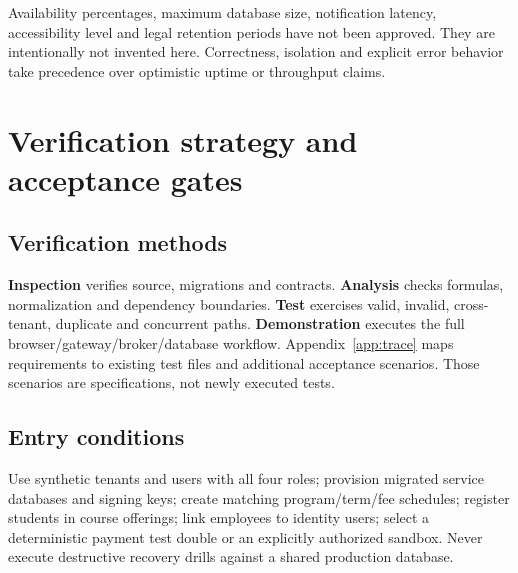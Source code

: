 \documentclass[10pt,a4paper]{article}
\begin{document}
Availability percentages, maximum database size, notification latency, accessibility
level and legal retention periods have not been approved. They are intentionally
not invented here. Correctness, isolation and explicit error behavior take precedence
over optimistic uptime or throughput claims.

\clearpage
\appendix
\section{Verification strategy and acceptance gates}\label{sec:acceptance}
\subsection{Verification methods}
\textbf{Inspection} verifies source, migrations and contracts.
\textbf{Analysis} checks formulas, normalization and dependency boundaries.
\textbf{Test} exercises valid, invalid, cross-tenant, duplicate and concurrent paths.
\textbf{Demonstration} executes the full browser/gateway/broker/database workflow.
Appendix~\ref{app:trace} maps requirements to existing test files and additional
acceptance scenarios. Those scenarios are specifications, not newly executed tests.

\subsection{Entry conditions}
Use synthetic tenants and users with all four roles; provision migrated service
databases and signing keys; create matching program/term/fee schedules; register
students in course offerings; link employees to identity users; select a deterministic
payment test double or an explicitly authorized sandbox. Never execute destructive
recovery drills against a shared production database.
\end{document}
